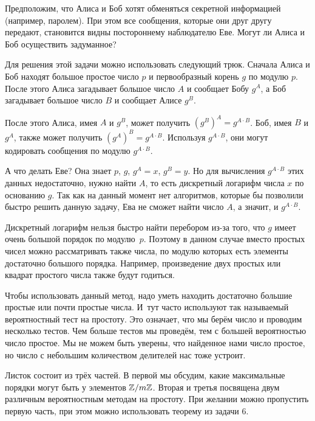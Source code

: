 \documentclass[a4paper,12pt]{article}
\begin{document}


{\footnotesize Предположим, что Алиса и Боб хотят обменяться секретной информацией (например, паролем). При этом все сообщения, которые они друг другу передают, становится видны постороннему наблюдателю Еве. Могут ли Алиса и Боб осуществить задуманное?

Для решения этой задачи можно использовать следующий трюк. Сначала Алиса и Боб находят большое простое число $p$ и первообразный корень $g$ по модулю $p$. После этого Алиса загадывает большое число $A$ и сообщает Бобу $g^A$, а Боб загадывает большое число $B$ и сообщает Алисе $g^B$.

После этого Алиса, имея $A$ и $g^B$, может получить $(g^B)^A=g^{A\cdot B}$. Боб, имея $B$ и $g^A$, также может получить $(g^A)^B = g^{A \cdot B}$. Используя $g^{A \cdot B}$, они могут кодировать сообщения по модулю $g^{A\cdot B}$.

А что делать Еве? Она знает $p$, $g$, $g^A = x$, $g^B=y$. Но для вычисления $g^{A\cdot B}$ этих данных недостаточно, нужно найти $A$, то есть дискретный логарифм числа $x$ по основанию $g$. Так как на данный момент нет алгоритмов, которые бы позволили быстро решить данную задачу, Ева не сможет найти число $A$, а значит, и $g^{A \cdot B}$.

Дискретный логарифм нельзя быстро найти перебором из-за того, что $g$ имеет очень большой порядок по модулю~$p$. Поэтому в данном случае вместо простых чисел можно рассматривать также числа, по модулю которых есть элементы достаточно большого порядка. Например, произведение двух простых или квадрат простого числа также будут годиться.

Чтобы использовать данный метод, надо уметь находить достаточно большие простые или почти простые числа. И~тут часто используют так называемый вероятностный тест на простоту. Это означает, что мы берём число и проводим несколько тестов. Чем больше тестов мы проведём, тем с большей вероятностью число простое. Мы не можем быть уверены, что найденное нами число простое, но число с небольшим количеством делителей нас тоже устроит.

Листок состоит из трёх частей. В первой мы обсудим, какие максимальные порядки могут быть у элементов $\mathbb{Z}/m\mathbb{Z}$. Вторая и третья посвящена двум различным вероятностным методам на простоту. При желании можно пропустить первую часть, при этом можно использовать теорему из задачи 6.}
\end{document}
